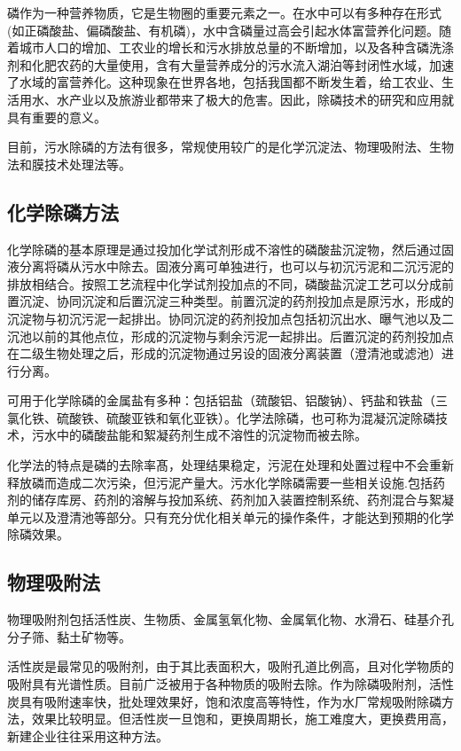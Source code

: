 \documentclass[
]{book}
\begin{document}
磷作为一种营养物质，它是生物圈的重要元素之一。在水中可以有多种存在形式 (如正磷酸盐、偏磷酸盐、有机磷)，水中含磷量过高会引起水体富营养化问题。随着城市人口的增加、工农业的增长和污水排放总量的不断增加，以及各种含磷洗涤剂和化肥农药的大量使用，含有大量营养成分的污水流入湖泊等封闭性水域，加速了水域的富营养化。这种现象在世界各地，包括我国都不断发生着，给工农业、生活用水、水产业以及旅游业都带来了极大的危害。因此，除磷技术的研究和应用就具有重要的意义。

目前，污水除磷的方法有很多，常规使用较广的是化学沉淀法、物理吸附法、生物法和膜技术处理法等。

\hypertarget{ux5316ux5b66ux9664ux78f7ux65b9ux6cd5}{%
\subsection{化学除磷方法}\label{ux5316ux5b66ux9664ux78f7ux65b9ux6cd5}}

化学除磷的基本原理是通过投加化学试剂形成不溶性的磷酸盐沉淀物，然后通过固液分离将磷从污水中除去。固液分离可单独进行，也可以与初沉污泥和二沉污泥的排放相结合。按照工艺流程中化学试剂投加点的不同，磷酸盐沉淀工艺可以分成前置沉淀、协同沉淀和后置沉淀三种类型。前置沉淀的药剂投加点是原污水，形成的沉淀物与初沉污泥一起排出。协同沉淀的药剂投加点包括初沉出水、曝气池以及二沉池以前的其他点位，形成的沉淀物与剩余污泥一起排出。后置沉淀的药剂投加点在二级生物处理之后，形成的沉淀物通过另设的固液分离装置（澄清池或滤池）进行分离。

可用于化学除磷的金属盐有多种：包括铝盐（巯酸铝、铝酸钠）、钙盐和铁盐（三氯化铁、硫酸铁、硫酸亚铁和氧化亚铁）。化学法除磷，也可称为混凝沉淀除磷技术，污水中的磷酸盐能和絮凝药剂生成不溶性的沉淀物而被去除。

化学法的特点是磷的去除率髙，处理结果稳定，污泥在处理和处置过程中不会重新释放磷而造成二次污染，但污泥产量大。污水化学除磷需要一些相关设施.包括药剂的储存库房、药剂的溶解与投加系统、药剂加入装置控制系统、药剂混合与絮凝单元以及澄清池等部分。只有充分优化相关单元的操作条件，才能达到预期的化学除磷效果。

\hypertarget{ux7269ux7406ux5438ux9644ux6cd5}{%
\subsection{物理吸附法}\label{ux7269ux7406ux5438ux9644ux6cd5}}

物理吸附剂包括活性炭、生物质、金属氢氧化物、金属氧化物、水滑石、硅基介孔分子筛、黏土矿物等。

活性炭是最常见的吸附剂，由于其比表面积大，吸附孔道比例高，且对化学物质的吸附具有光谱性质。目前广泛被用于各种物质的吸附去除。作为除磷吸附剂，活性炭具有吸附速率快，批处理效果好，饱和浓度高等特性，作为水厂常规吸附除磷方法，效果比较明显。但活性炭一旦饱和，更换周期长，施工难度大，更换费用高，新建企业往往采用这种方法。
\end{document}
